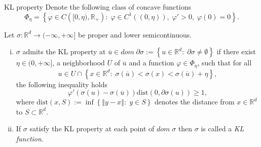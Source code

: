 \documentclass[9pt,handout]{beamer} %
\newcommand{\rr}{\mathbb{R}} %
\newcommand{\norm}[1]{\left\Vert {#1} \right\Vert} %
\newcommand{\dist}{\mathrm{dist}} %
\begin{document}
	\begin{frame}{KL property}
		Denote the following class of concave functions
\begin{equation*}
	\Phi_{\eta} = \left\lbrace \varphi \in C\left([0,\eta), \rr_+ \right)  : \; \varphi \in C^1\left((0,\eta)\right), \; \varphi'>0, \; \varphi(0)=0 \right\rbrace .
\end{equation*}

		\begin{definition}
	Let $\sigma: \rr^d \rightarrow (-\infty,+\infty]$ be proper and lower semicontinuous.
			\begin{enumerate}[(i)]
				\item $\sigma$ admits the KL property at $\overline{u} \in dom \; \partial\sigma :=  \left\lbrace u \in \rr^d : \; \partial\sigma \neq \emptyset \right\rbrace$ if there exist $\eta \in (0,+\infty]$, a neighborhood $U$ of $\overline{u}$ and a function $\varphi \in \Phi_{\eta}$, such that for all
				\begin{equation*}
					u \in U \cap \left\lbrace x \in \rr^d : \; \sigma(\overline{u}) < \sigma(x) < \sigma(\overline{u}) + \eta \right\rbrace,
				\end{equation*}
		the following inequality holds
		\begin{equation*}
			\varphi'(\sigma(u) - \sigma(\overline{u}))\dist(0,\partial\sigma(u)) \geq 1,
		\end{equation*}
		where $\dist(x,S) := \inf \left\lbrace \norm{y-x} : \; y \in S\right\rbrace$ denotes the distance from $x \in \rr^d$ to $S \subset \rr^d$.
		\item If $\sigma$ satisfy the KL property at each point of $dom\;\sigma$ then $\sigma$ is called a \textit{KL function}.
	\end{enumerate}
\end{definition}
	\end{frame}
\end{document}
